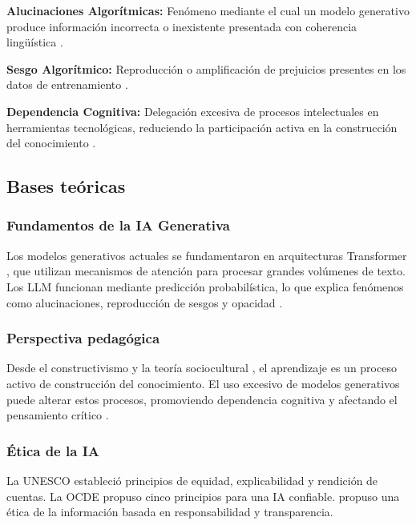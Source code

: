 \documentclass[review]{elsarticle}
\begin{document}
	\textbf{Alucinaciones Algorítmicas:} Fenómeno mediante el cual un modelo generativo produce información incorrecta o inexistente presentada con coherencia lingüística \citep{yan2023}.
	
	\textbf{Sesgo Algorítmico:} Reproducción o amplificación de prejuicios presentes en los datos de entrenamiento \citep{bender2021}.
	
	\textbf{Dependencia Cognitiva:} Delegación excesiva de procesos intelectuales en herramientas tecnológicas, reduciendo la participación activa en la construcción del conocimiento \citep{guzmanvaldivia2024}.
	
	\subsection{Bases teóricas}
	
	\subsubsection{Fundamentos de la IA Generativa}
	
	Los modelos generativos actuales se fundamentaron en arquitecturas Transformer \citep{vaswani2017}, que utilizan mecanismos de atención para procesar grandes volúmenes de texto. Los LLM funcionan mediante predicción probabilística, lo que explica fenómenos como alucinaciones, reproducción de sesgos y opacidad \citep{bender2021, yan2023}.
	
	\subsubsection{Perspectiva pedagógica}
	
	Desde el constructivismo \citep{piaget1970} y la teoría sociocultural \citep{vygotsky1978}, el aprendizaje es un proceso activo de construcción del conocimiento. El uso excesivo de modelos generativos puede alterar estos procesos, promoviendo dependencia cognitiva y afectando el pensamiento crítico \citep{guzmanvaldivia2024, gallenttorres2023}.
	
	\subsubsection{Ética de la IA}
	
	La UNESCO \citep{unesco2021} estableció principios de equidad, explicabilidad y rendición de cuentas. La OCDE \citep{oecd2019} propuso cinco principios para una IA confiable. \citet{floridi2013} propuso una ética de la información basada en responsabilidad y transparencia.
	
\end{document}
